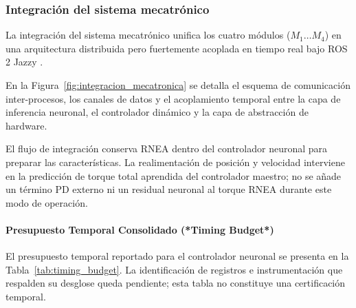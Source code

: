 \documentclass[12pt]{article}
\begin{document}
\subsubsection{Integración del sistema mecatrónico}
\label{sssec:integracion_sistema_mecatronico}

La integración del sistema mecatrónico unifica los cuatro módulos ($M_1 \dots M_4$) en una arquitectura distribuida pero fuertemente acoplada en tiempo real bajo ROS 2 Jazzy \cite{macenski2022robot}. 

En la Figura~\ref{fig:integracion_mecatronica} se detalla el esquema de comunicación inter-procesos, los canales de datos y el acoplamiento temporal entre la capa de inferencia neuronal, el controlador dinámico y la capa de abstracción de hardware.

El flujo de integración conserva RNEA dentro del controlador neuronal para preparar las características. La realimentación de posición y velocidad interviene en la predicción de torque total aprendida del controlador maestro; no se añade un término PD externo ni un residual neuronal al torque RNEA durante este modo de operación.

\paragraph{Presupuesto Temporal Consolidado (*Timing Budget*)}
El presupuesto temporal reportado para el controlador neuronal se presenta en la Tabla~\ref{tab:timing_budget}. La identificación de registros e instrumentación que respalden su desglose queda pendiente; esta tabla no constituye una certificación temporal.
\end{document}

